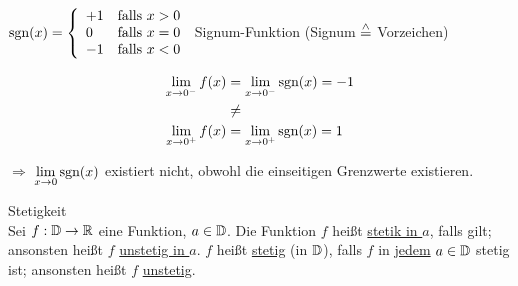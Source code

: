 \Bsp $\mathbin\text{sgn}(x) = \left\{
\begin{array}{ll}
+1&\text{falls }x>0\\
0&\text{falls }x=0\\
-1&\text{falls }x<0\\
\end{array}\right.$ Signum-Funktion (Signum $\stackrel{\wedge}{=}$ Vorzeichen)


\begin{align*}
\lim\limits_{x\to 0^-}f(x) &= \lim\limits_{x\to 0^-}\mathbin\text{sgn}(x) = -1\\
&\ne\\
\lim\limits_{x\to 0^+}f(x) &= \lim\limits_{x\to 0^+}\mathbin\text{sgn}(x) = 1\\
\end{align*}

$\Rightarrow$ $\lim\limits_{x\to0}\mathbin\text{sgn}(x)$ existiert nicht, obwohl die einseitigen Grenzwerte existieren.

\Def Stetigkeit\\
Sei $f:\mathbb{D}\to\mathbb{R}$ eine Funktion, $a\in\mathbb{D}$. Die Funktion $f$ heißt \ul{stetik in $a$}, falls  gilt; ansonsten heißt $f$ \ul{unstetig in $a$}. $f$ heißt \ul{stetig} (in $\mathbb{D}$), falls $f$ in \ul{jedem} $a\in\mathbb{D}$ stetig ist; ansonsten heißt $f$ \ul{unstetig}.

